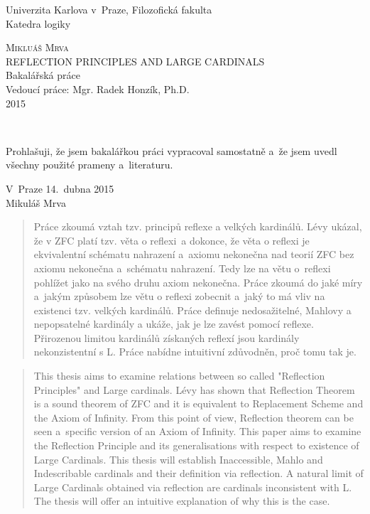 \documentclass[12pt,a4paper]{article}
\begin{document}
\begin{titlepage}
\Large
\begin{center}
Univerzita Karlova v~Praze, Filozofick{\/á} fakulta\\
Katedra logiky

\vspace{8.5em}
\textsc{Mikluáš Mrva}\\[1.4em]
{REFLECTION PRINCIPLES AND LARGE CARDINALS}\\
Bakalářská práce\\[6.8em]
Vedoucí práce: Mgr. Radek Honzík, Ph.D.\\[6.8em]
2015
\end{center}
\end{titlepage}\





\vspace{\fill}
\noindent 
Prohlašuji, že jsem bakalářkou práci vypracoval samostatně a~že jsem uvedl všechny použité prameny a~literaturu.

\bigskip
\noindent V~Praze 14.~dubna 2015\\[3em]
\hspace*{\fill}Mikuláš Mrva\hspace*{3em}
\clearpage

\begin{abstract}
\noindent Práce zkoumá vztah tzv. principů reflexe a velkých kardinálů. Lévy ukázal, že v ZFC platí tzv. věta o reflexi~a dokonce, že věta o reflexi je ekvivalentní schématu nahrazení a~axiomu nekonečna nad teorií ZFC bez axiomu nekonečna a~schématu nahrazení. Tedy lze na větu o~reflexi pohlížet jako na svého druhu axiom nekonečna. Práce zkoumá do jaké míry a~jakým způsobem lze větu o reflexi zobecnit a~jaký to má vliv na existenci tzv. velkých kardinálů. Práce definuje nedosažitelné, Mahlovy a nepopsatelné kardinály a ukáže, jak je lze zavést pomocí reflexe. Přirozenou limitou kardinálů získaných reflexí jsou kardinály nekonzistentní s L. Práce nabídne intuitivní zdůvodněn, proč tomu tak je.

\end{abstract}
\bigskip
\renewcommand{\abstractname}{Abstract}
\begin{abstract}
\noindent This thesis aims to examine relations between so called "Reflection Principles" and Large cardinals. Lévy has shown that Reflection Theorem is a sound theorem of ZFC and it is equivalent to Replacement Scheme and the Axiom of Infinity. From this point of view, Reflection theorem can be seen a~specific version of an Axiom of Infinity. This paper aims to examine the Reflection Principle and its generalisations with respect to existence of Large Cardinals. This thesis will establish Inaccessible, Mahlo and Indescribable cardinals and their definition via reflection. A natural limit of Large Cardinals obtained via reflection are cardinals inconsistent with L. The thesis will offer an intuitive explanation of why this is the case.
\end{abstract}
\clearpage
\end{document}
